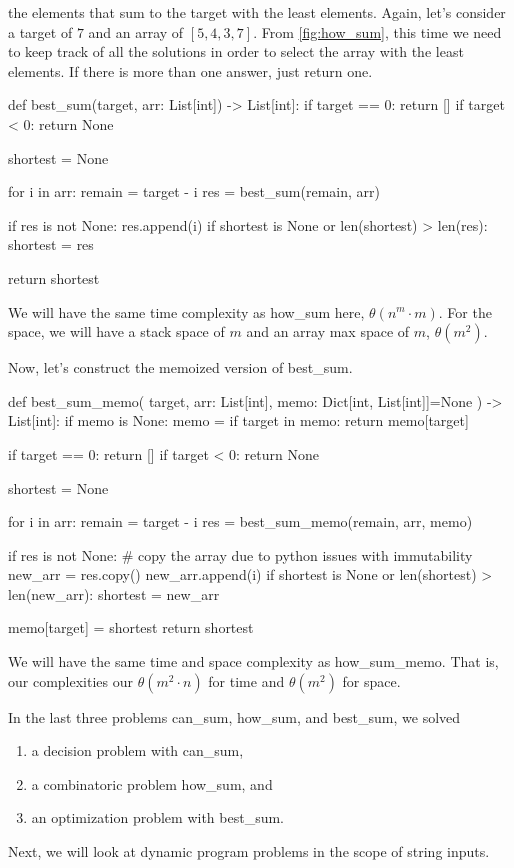 \documentclass[12pt,dvipsnames,svgnames,x11names]{article}
\begin{document}
the elements that sum to the target with the least elements. Again, let's consider a target of \(7\) and an
array of \([5, 4, 3, 7]\). From \cref{fig:how_sum}, this time we need to keep track of all the solutions in
order to select the array with the least elements. If there is more than one answer, just return one.
\begin{python}
def best_sum(target, arr: List[int]) -> List[int]:
  if target == 0:
      return []
  if target < 0:
      return None
    
  shortest = None
    
  for i in arr:
      remain = target - i
      res = best_sum(remain, arr)
        
      if res is not None:
          res.append(i)
          if shortest is None or len(shortest) > len(res):
              shortest = res
                
  return shortest
\end{python}
We will have the same time complexity as how\_sum here, \(\theta(n^m\cdot m)\). For the space, we will
have a stack space of \(m\) and an array max space of \(m\), \(\theta (m^2)\).
\par\medskip
Now, let's construct the memoized version of best\_sum.
\begin{python}
def best_sum_memo(
    target, 
    arr: List[int], 
    memo: Dict[int, List[int]]=None
    ) -> List[int]:
  if memo is None:
      memo = {}
  if target in memo:
      return memo[target]
    
  if target == 0:
      return []
  if target < 0:
      return None
    
  shortest = None
    
  for i in arr:
      remain = target - i
      res = best_sum_memo(remain, arr, memo)
        
      if res is not None:
          # copy the array due to python issues with immutability
          new_arr = res.copy()
          new_arr.append(i)
          if shortest is None or len(shortest) > len(new_arr):
              shortest = new_arr
                
  memo[target] = shortest   
  return shortest
\end{python}
We will have the same time and space complexity as how\_sum\_memo. That is, our complexities our
\(\theta (m^2\cdot n)\) for time and \(\theta (m^2)\) for space.
\par\medskip
In the last three problems can\_sum, how\_sum, and best\_sum, we solved
\begin{enumerate}
	\item a decision problem with can\_sum,
	\item a combinatoric problem how\_sum, and
	\item an optimization problem with best\_sum.
\end{enumerate}
Next, we will look at dynamic program problems in the scope of string inputs.
\par\medskip
\end{document}
